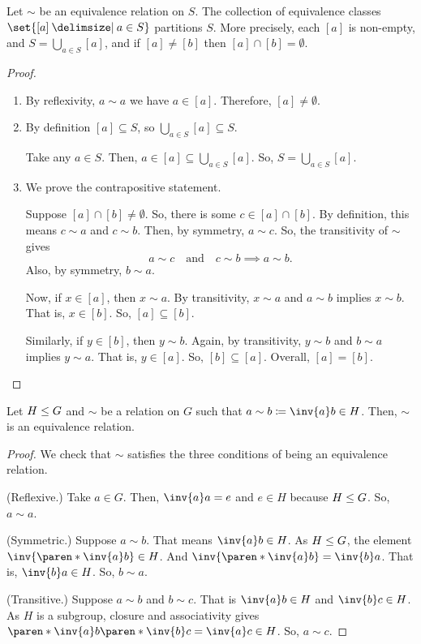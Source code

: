 \documentclass[11pt]{penrose}
\begin{document}
\begin{nthm}
    Let $\sim$ be an equivalence relation on $S$. The collection of equivalence classes $\set{[a] \st a \in S}$ partitions $S$. More precisely, each $[a]$ is non-empty, and $S = \bigcup_{a \in S} [a]$, and if $[a] \neq [b]$ then $[a] \cap [b] = \emptyset$.
\end{nthm}
\begin{proof}\phantom{}
    \begin{enumerate}
        \item By reflexivity, $a \sim a$ we have $a \in [a]$. Therefore, $[a] \neq \emptyset$.

        \item By definition $[a] \subseteq S$, so $\bigcup_{a \in S} [a] \subseteq S$.

        Take any $a \in S$. Then, $a \in [a] \subseteq \bigcup_{a \in S} [a]$. So, $S = \bigcup_{a \in S} [a]$.

        \item We prove the contrapositive statement.

        Suppose $[a] \cap [b] \neq \emptyset$. So, there is some $c \in [a] \cap [b]$. By definition, this means $c \sim a$ and $c \sim b$. Then, by symmetry, $a \sim c$. So, the transitivity of $\sim$ gives
        \begin{equation*}
            a \sim c \quad\text{and}\quad c \sim b \implies a \sim b.
        \end{equation*}
        Also, by symmetry, $b \sim a$.

        Now, if $x \in [a]$, then $x \sim a$. By transitivity, $x \sim a$ and $a \sim b$ implies $x \sim b$. That is, $x \in [b]$. So, $[a] \subseteq [b]$.

        Similarly, if $y \in [b]$, then $y \sim b$. Again, by transitivity, $y \sim b$ and $b \sim a$ implies $y \sim a$. That is, $y \in [a]$. So, $[b] \subseteq [a]$. Overall, $[a] = [b]$.\qedhere
    \end{enumerate}
\end{proof}

\begin{nthm}
    Let $H \mathrel{\leq} G$ and $\sim$ be a relation on $G$ such that $a \sim b \coloneq \inv{a} b \in H$. Then, $\sim$ is an equivalence relation.
\end{nthm}
\begin{proof}
    We check that $\sim$ satisfies the three conditions of being an equivalence relation.
    
    (Reflexive.) Take $a \in G$. Then, $\inv{a} a = e$ and $e \in H$ because $H \mathrel{\leq} G$. So, $a \sim a$.

    (Symmetric.) Suppose $a \sim b$. That means $\inv{a} b \in H$. As $H \mathrel{\leq} G$, the element $\inv{\paren*{\inv{a} b}} \in H$. And $\inv{\paren*{\inv{a} b}} = \inv{b} a$. That is, $\inv{b} a \in H$. So, $b \sim a$.

    (Transitive.) Suppose $a \sim b$ and $b \sim c$. That is $\inv{a} b \in H$ and $\inv{b} c \in H$. As $H$ is a subgroup, closure and associativity gives $\paren*{\inv{a} b} \paren*{\inv{b} c} = \inv{a} c \in H$. So, $a \sim c$. \qedhere
\end{proof}
\end{document}
